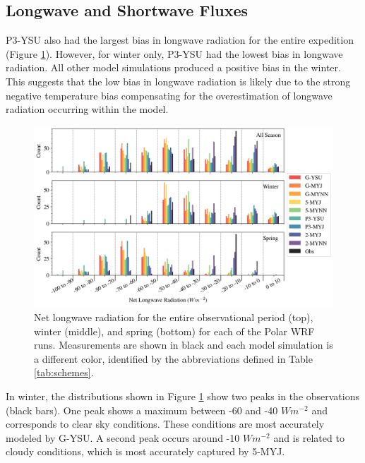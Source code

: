 \subsection{Longwave and Shortwave Fluxes}
 P3-YSU also had the largest bias in longwave radiation for the entire expedition (Figure \ref{fig:wrf_netlw}). However, for winter only, P3-YSU had the lowest bias in longwave radiation. All other model simulations produced a positive bias in the winter. This suggests that the low bias in longwave radiation is likely due to the strong negative temperature bias compensating for the overestimation of longwave radiation occurring within the model. 

\begin{figure}[h]
    \centering
    \includegraphics[width=1\linewidth]{figures/chapter3/WRF_NetLW_Histo.png}
    \caption[Polar WRF simulated net longwave radiation histograms.]{Net longwave radiation for the entire observational period (top), winter (middle), and spring (bottom) for each of the Polar WRF runs. Measurements are shown in black and each model simulation is a different color, identified by the abbreviations defined in Table \ref{tab:schemes}.}
    \label{fig:wrf_netlw}
\end{figure}
 
 In winter, the distributions shown in Figure \ref{fig:wrf_netlw} show two peaks in the observations (black bars). One peak shows a maximum between -60 and -40 $Wm^{-2}$ and corresponds to clear sky conditions. These conditions are most accurately modeled by G-YSU. A second peak occurs around -10 $Wm^{-2}$ and is related to cloudy conditions, which is most accurately captured by 5-MYJ.

